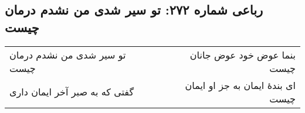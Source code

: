 \begin{center}
\section*{رباعی شماره ۲۷۲: تو سیر شدی من نشدم درمان چیست}
\label{sec:0272}
\begin{longtable}{l p{0.5cm} r}
تو سیر شدی من نشدم درمان چیست
&&
بنما عوض خود عوض جانان چیست
\\
گفتی که به صبر آخر ایمان داری
&&
ای بندهٔ ایمان به جز او ایمان چیست
\\
\end{longtable}
\end{center}
